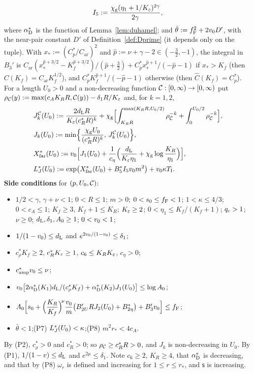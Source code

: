 \begin{definition}[Parameters]
\begin{align*}
I_5:=\frac{\chi_{\mathrm g}(\eta_1+1/K_\varepsilon)^{2\gamma}}{2\gamma},
\end{align*}
where $\alpha^*_{\mathrm D}$ is the function of Lemma~\ref{lem:duhamel}; and $\bar\theta:=f_{\mathrm F}^2+2v_0 D'$, with the near-pair constant $D'$ of
Definition~\ref{def:Dprime} (it depends only on the tuple). With $x_*:=(C_p^*/C_{\mathrm{ar}})^2$ and $\hat p:=\nu+\gamma-2\in(-\frac32,-1)$,
the integral in $B_3'$ is $C_{\mathrm{ar}}(x_*^{\hat p+3/2}-K_f^{\hat p+3/2})/(\hat p+\frac32)+C_p^*x_*^{\hat p+1}/(-\hat p-1)$ if $x_*>K_f$
(then $\hat C(K_f)=C_{\mathrm{ar}}K_f^{1/2}$), and $C_p^*K_f^{\hat p+1}/(-\hat p-1)$ otherwise (then $\hat C(K_f)=C_p^*$). For a length $U_0>0$ and a
non-decreasing function $\mathcal C:[0,\infty)\to[0,\infty)$ put $\rho_{\mathcal C}(y):=\max(c_AK_RR,\mathcal C(y))-\delta_1R/K_\varepsilon$ and, for $k=1,2$,
\begin{align*}
&J_k^{\mathcal C}(U_0):=\frac{2d_{\mathrm L} R}{K_\varepsilon(c_R^*R)^k}+\chi_{\mathrm g}\Bigl[\int_{K_RR}^{\max(K_RR,U_0/2)}\rho_{\mathcal C}^{-k}+\int_0^{U_0/2}\rho_{\mathcal C}^{-k}\Bigr],\\
&J_k(U_0):=\min\Bigl\{\frac{\chi_{\mathrm g} U_0}{(c_R^*R)^k},\,J_k^{\mathcal C}(U_0)\Bigr\},\\
&X^*_{\mathrm{far}}(U_0):=v_0\Bigl[J_1(U_0)+\frac1{c_\eta}\Bigl(\frac{d_{\mathrm L}}{K_\varepsilon\eta_1}+\chi_{\mathrm g}\log\frac{K_R}{\eta_1}\Bigr)\Bigr],\\
&L^*_J(U_0):=\exp\bigl(X^*_{\mathrm{far}}(U_0)+B_5^*I_5v_0 m^2\bigr)+v_0\kappa T_{\mathrm I} .
\end{align*}
\endgroup
{}\textbf{Side conditions} for $(p,U_0,\mathcal C)$:
\begin{itemize}
\item[(P0)] $1/2<\gamma$, $\gamma+\nu<1$; $0<R\le1$; $m>0$; $0<s_0\le f_{\mathrm F}<1$; $1<\kappa\le4/3$; $0<c_A\le1$; $K_f\ge3$,
$K_f+1\le K_R$; $K_\varepsilon\ge2$; $0<\eta_1\le K_f/(K_f+1)$; $q_{\mathrm c}>1$; $\nu\ge0$; $d_{\mathrm L},\delta_1,A_0\ge1$; $0<v_0<1$;
\item[(P1)] $1/(1-v_0)\le d_{\mathrm L}$ and $e^{2v_0/(1-v_0)}\le\delta_1$;
\item[(P2)] $c_\rho^*K_f\ge2$, $c_R^*K_\varepsilon\ge1$, $c_6\le K_RK_\varepsilon$, $c_\eta>0$;
\item[(P3)] $c^*_{\mathrm{amp}}v_0\le\nu$;
\item[(P4)] $v_0\bigl[2\alpha^*_{\mathrm D}(K_1)d_{\mathrm L}/(c_\rho^*K_f)+\alpha^*_{\mathrm D}(K_2)J_1(U_0)\bigr]\le\log A_0$;
\item[(P5)] $A_0\Bigl[s_0+\Bigl(\dfrac{K_R}{K_f}\Bigr)^{\!\nu}\dfrac{v_0}m\bigl(B_{2U}'RJ_2(U_0)+B_{2\eta}^*\bigr)+B_3'v_0\Bigr]\le f_{\mathrm F}$;
\item[(P6)] $\bar\theta<1$;\qquad (P7) $L^*_J(U_0)<\kappa$;\qquad (P8) $m^2r_*<4c_A$.
\end{itemize}
\end{definition}
By (P2), $c_\rho^*>0$ and $c_R^*>0$; so $\rho_{\mathcal C}\ge c_R^*R>0$, and $J_k$ is non-decreasing in $U_0$. By (P1), $1/(1-v)\le d_{\mathrm L}$
and $e^{2\mu}\le\delta_1$. Note $c_6\ge2$, $K_R\ge4$, that $\alpha^*_{\mathrm D}$ is decreasing, and that by (P8) $\omega_r$ is defined and
increasing for $1\le r\le r_*$, and $\mathsf s$ is increasing.

